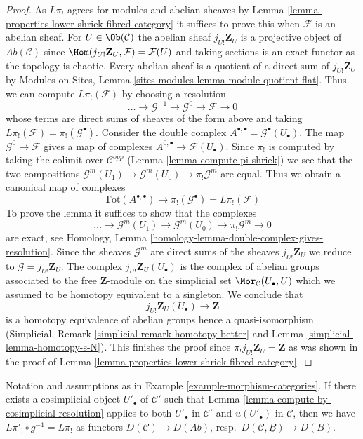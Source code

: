 \begin{proof}
As $L\pi_!$ agrees for modules and abelian sheaves by
Lemma \ref{lemma-properties-lower-shriek-fibred-category}
it suffices to prove this when $\mathcal{F}$ is an abelian sheaf.
For $U \in \Ob(\mathcal{C})$ the abelian sheaf $j_{U!}\mathbf{Z}_U$
is a projective object of $\textit{Ab}(\mathcal{C})$ since
$\Hom(j_{U!}\mathbf{Z}_U, \mathcal{F}) = \mathcal{F}(U)$
and taking sections is an exact functor as the topology is chaotic.
Every abelian sheaf is a quotient of a direct sum of $j_{U!}\mathbf{Z}_U$
by Modules on Sites, Lemma \ref{sites-modules-lemma-module-quotient-flat}.
Thus we can compute $L\pi_!(\mathcal{F})$ by choosing a resolution
$$
\ldots \to \mathcal{G}^{-1} \to \mathcal{G}^0 \to \mathcal{F} \to 0
$$
whose terms are direct sums of sheaves of the form above and taking
$L\pi_!(\mathcal{F}) = \pi_!(\mathcal{G}^\bullet)$. Consider the
double complex
$A^{\bullet, \bullet} = \mathcal{G}^\bullet(U_\bullet)$.
The map $\mathcal{G}^0 \to \mathcal{F}$ gives a map of complexes
$A^{0, \bullet} \to \mathcal{F}(U_\bullet)$.
Since $\pi_!$ is computed by taking the colimit over
$\mathcal{C}^{opp}$ (Lemma \ref{lemma-compute-pi-shriek})
we see that the two compositions
$\mathcal{G}^m(U_1) \to \mathcal{G}^m(U_0) \to \pi_!\mathcal{G}^m$
are equal. Thus we obtain a canonical map of complexes
$$
\text{Tot}(A^{\bullet, \bullet})
\longrightarrow
\pi_!(\mathcal{G}^\bullet) = L\pi_!(\mathcal{F})
$$
To prove the lemma it suffices to show that the complexes
$$
\ldots \to \mathcal{G}^m(U_1) \to \mathcal{G}^m(U_0) \to
\pi_!\mathcal{G}^m \to 0
$$
are exact, see Homology, Lemma
\ref{homology-lemma-double-complex-gives-resolution}.
Since the sheaves $\mathcal{G}^m$ are direct sums of the sheaves
$j_{U!}\mathbf{Z}_U$ we reduce to $\mathcal{G} = j_{U!}\mathbf{Z}_U$.
The complex $j_{U!}\mathbf{Z}_U(U_\bullet)$
is the complex of abelian groups associated to the free
$\mathbf{Z}$-module on the simplicial set
$\Mor_\mathcal{C}(U_\bullet, U)$ which we assumed to be homotopy
equivalent to a singleton. We conclude that
$$
j_{U!}\mathbf{Z}_U(U_\bullet) \to \mathbf{Z}
$$
is a homotopy equivalence of abelian groups hence a quasi-isomorphism
(Simplicial, Remark \ref{simplicial-remark-homotopy-better} and
Lemma \ref{simplicial-lemma-homotopy-s-N}). This finishes the proof
since $\pi_!j_{U!}\mathbf{Z}_U = \mathbf{Z}$
as was shown in the proof of
Lemma \ref{lemma-properties-lower-shriek-fibred-category}.
\end{proof}

\begin{lemma}
\label{lemma-get-it-now}
Notation and assumptions as in Example \ref{example-morphism-categories}.
If there exists a cosimplicial object $U'_\bullet$ of $\mathcal{C}'$
such that Lemma \ref{lemma-compute-by-cosimplicial-resolution}
applies to both $U'_\bullet$ in $\mathcal{C}'$
and $u(U'_\bullet)$ in $\mathcal{C}$, then we have
$L\pi'_! \circ g^{-1} = L\pi_!$ as functors
$D(\mathcal{C}) \to D(\textit{Ab})$,
resp.\ $D(\mathcal{C}, \underline{B}) \to D(B)$.
\end{lemma}

